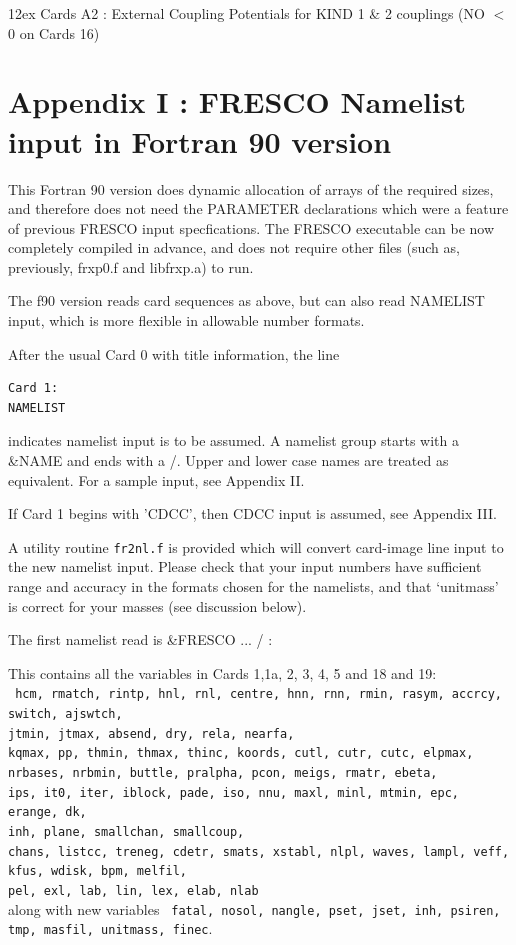 \documentclass[11pt]{article}
\begin{document}
\hangindent 12ex
Cards A2 :  External Coupling Potentials for KIND 1 \& 2 couplings
(NO $<$ 0 on Cards 16)

\newpage
\appendix
\section*{Appendix I : FRESCO Namelist input in Fortran 90 version}
%
\bigskip
This Fortran 90 version does dynamic allocation of arrays of the
required sizes, and therefore does not need the PARAMETER declarations
which were a feature of previous FRESCO input specfications. The
FRESCO executable can be now completely compiled in advance,
and does not require other files (such as, previously, frxp0.f and
libfrxp.a) to run.

\bigskip
The f90 version reads card sequences as above, but can also read NAMELIST
input, which is more flexible in allowable number formats.

After the usual Card 0 with title information, the line
\begin{verbatim}
Card 1:
NAMELIST
\end{verbatim}
indicates namelist input is to be assumed.
A namelist group starts with a \&NAME and ends with a /. Upper and lower
case names are treated as equivalent. For a sample input, see Appendix II.

If Card 1 begins with 'CDCC', then CDCC input is assumed, see Appendix III.

\bigskip
A utility routine {\tt fr2nl.f} is provided which will convert card-image
line input to the new namelist input.
Please check that your input numbers have sufficient
range and accuracy in the formats chosen for the namelists,
and that `unitmass' is correct for your masses (see discussion  below).

\bigskip
The first namelist read is \&FRESCO ... / :


This contains all the variables in Cards 1,1a, 2, 3, 4, 5 and  18 and 19:\\
{\tt
hcm, rmatch, rintp, hnl, rnl, centre, hnn, rnn, rmin,
    rasym, accrcy, switch, ajswtch,  \\
jtmin, jtmax, absend, dry, rela, nearfa, \\
kqmax, pp, thmin, thmax, thinc, koords, cutl, cutr, cutc, elpmax,\\
nrbases, nrbmin, buttle, pralpha, pcon, meigs, rmatr, ebeta, \\
ips, it0, iter, iblock, pade, iso, nnu, maxl, minl, mtmin, epc, erange, dk, \\
inh, plane, smallchan, smallcoup, \\
chans, listcc, treneg, cdetr, smats, xstabl, nlpl, waves,
   lampl, veff, kfus, wdisk, bpm, melfil, \\
pel, exl, lab, lin, lex, elab, nlab
}\\
along with new variables {\tt
fatal, nosol, nangle, pset, jset, inh, psiren, tmp, masfil, unitmass, finec}.
\end{document}

